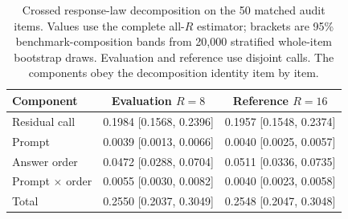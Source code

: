 \begin{table}[t]
\centering
\small
\begin{tabular}{lcc}
\toprule
Component & Evaluation $R=8$ & Reference $R=16$ \\
\midrule
Residual call & 0.1984 [0.1568, 0.2396] & 0.1957 [0.1548, 0.2374] \\
Prompt & 0.0039 [0.0013, 0.0066] & 0.0040 [0.0025, 0.0057] \\
Answer order & 0.0472 [0.0288, 0.0704] & 0.0511 [0.0336, 0.0735] \\
Prompt $\times$ order & 0.0055 [0.0030, 0.0082] & 0.0040 [0.0023, 0.0058] \\
Total & 0.2550 [0.2037, 0.3049] & 0.2548 [0.2047, 0.3048] \\
\bottomrule
\end{tabular}
\caption{Crossed response-law decomposition on the 50 matched audit items.
Values use the complete all-$R$ estimator; brackets are 95\%
benchmark-composition bands from
20,000 stratified whole-item bootstrap draws. Evaluation and reference use
disjoint calls. The components obey the decomposition identity item by item.}
\label{tab:decomposition}
\end{table}
